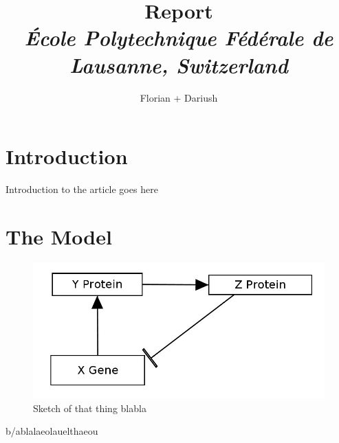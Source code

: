 \documentclass[10pt,a4paper,oneside,twocolumn]{article}
\numberwithin{equation}{section} %
\begin{document}
\title{\huge{\textbf{Report}}\\
	\vspace{0.5cm}
	\Large{\textit{\'Ecole Polytechnique F\'ed\'erale de Lausanne, Switzerland}}}
\author{\large{Florian + Dariush}}

\begin{titlepage}
 \maketitle
\thispagestyle{empty}
\end{titlepage}

\section{Introduction}
    Introduction to the article goes here \\
\section{The Model}

    \begin{figure}[!h]
	\centering
	\includegraphics[scale=0.3]{sketch.png}
	\caption{Sketch of that thing blabla}
    \end{figure}
    
    b/ablalaeolauelthaeou
\end{document}
